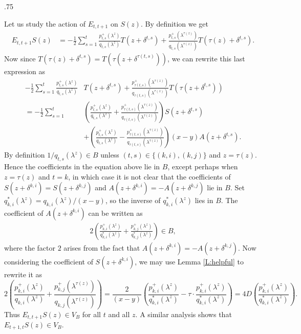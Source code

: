 \documentclass[11pt,fleqn]{article}
\makeatletter
\renewenvironment{proof}[1][\textit{Proof}]{\par
  \pushQED{\qed}%
  \normalfont \topsep.75\paraskip\relax
  \trivlist
  \item[\hskip\labelsep
        \itshape
    #1\@addpunct{.}]\ignorespaces
}{%
  \popQED\endtrivlist\@endpefalse
}
\makeatother
\begin{document}
\begin{proof}
Let us study the action of $E_{t,t+1}$ on $S(z)$. By definition we get
\begin{align*}
E_{t,t+1} S(z)
	&= - \frac{1}{2}\sum_{s=1}^t 
			\frac{p_{t,s}^+(\lambda^z)}{q_{t,s}(\lambda^z)}T(z + \delta^{t,s}) 
			+ \frac{p_{t,s}^+(\lambda^{\tau(z)})}{q_{t,s}(\lambda^{\tau(z)})}
				T(\tau(z) + \delta^{t,s}).
\end{align*}
Now since $T(\tau(z) + \delta^{t,s}) = T(\tau(z+\delta^{\tau(t,s)}))$, we can 
rewrite this last expression as 
\begin{align*}
- \frac{1}{2}\sum_{s=1}^t 
	\frac{p_{t,s}^+(\lambda^z)}{q_{t,s}(\lambda^z)}&T(z + \delta^{t,s}) 
	+ \frac{p_{\tau(t,s)}^+(\lambda^{\tau(z)})}
		{q_{\tau(t,s)}(\lambda^{\tau(z)})} T(\tau(z + \delta^{t,s})) \\
= -\frac{1}{2} \sum_{s=1}^t
	&\left( 
		\frac{p_{t,s}^+(\lambda^z)}{q_{t,s}(\lambda^z)} + 
		\frac{p_{\tau(t,s)}^+(\lambda^{\tau(z)})}
			{q_{\tau(t,s)}(\lambda^{\tau(z)})}
	\right) S(z+\delta^{t,s}) \\
&+
	\left( 
		\frac{p_{t,s}^+(\lambda^z)}{q_{t,s}(\lambda^z)} - 
		\frac{p_{\tau(t,s)}^+(\lambda^{\tau(z)})}
			{q_{\tau(t,s)}(\lambda^{\tau(z)})}
	\right) (x-y)A(z+\delta^{t,s}).	
\end{align*}
By definition $1/q_{t,s}(\lambda^z) \in B$ unless $(t,s) \in \{(k,i), (k,j)\}$
and $z = \tau (z)$. Hence the coefficients in the equation above lie in $B$, 
except perhaps when $z = \tau(z)$ and $t = k$, in which case it is not clear 
that the coefficients of $S(z + \delta^{k,i}) = S(z+\delta^{k,j})$ and $A(z + 
\delta^{k,i}) = -A(z + \delta^{k,j})$ lie in $B$. Set $q_{k,i}^*(\lambda^z) = 
q_{k,i}(\lambda^z)/(x-y)$, so the inverse of $q_{k,i}^*(\lambda^z)$ lies in 
$B$. The coefficient of $A(z + \delta^{k,i})$ can be written as 
\begin{align*}
2\left( 
		\frac{p_{k,i}^+(\lambda^z)}{q^*_{k,i}(\lambda^z)} + 
		\frac{p_{k,j}^+(\lambda^z)}{q_{k,j}^*(\lambda^z)}
	\right) \in B,
\end{align*}
where the factor $2$ arises from the fact that $A(z + \delta^{k,i}) = -A(z + 
\delta^{k,j})$. Now considering the coefficient of $S(z+\delta^{k,i})$, we may
use Lemma \ref{L:helpful} to rewrite it as 
\[
2\left(
\frac{p^+_{k,i}(\lambda^z)}{q_{k,i}(\lambda^z)} 
+ \frac{p^+_{k,j}(\lambda^{\tau(z)})}{q_{k,j}(\lambda^{\tau(z)})}
\right)
= \frac{2}{(x-y)} \left(
	\frac{p^+_{k,i}(\lambda^z)}{q_{k,i}^*(\lambda^z)} -
		\tau \cdot \frac{p^+_{k,i}(\lambda^z)}{q^*_{k,i}(\lambda^z)}
	\right)
= 4D\left(
	\frac{p^+_{k,i}(\lambda^z)}{q_{k,i}^*(\lambda^z)}
	\right).
\]
Thus $E_{t,t+1} S(z) \in V_B$ for all $t$ and all $z$. A similar analysis 
shows that $E_{t+1,t} S(z) \in V_B$.


\end{proof}
\end{document}
